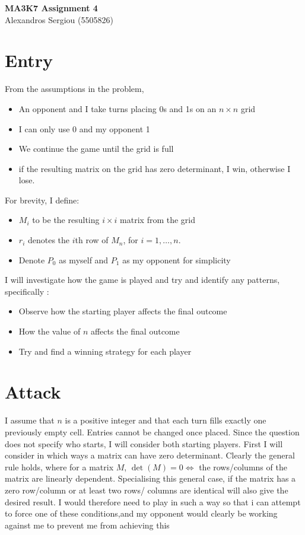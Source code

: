 \documentclass[11pt]{article}
\newcommand{\keywordfont}{\textsc}
\newcommand{\keyword}[1]{%
  \marginpar{\raggedright\small\keywordfont{#1}}}
\begin{document}
\Large
\begin{center}
\textbf{MA3K7 Assignment 4}
\\
Alexandros Sergiou (5505826)
\end{center}
\normalsize

\section{Entry}

\keyword{I KNOW}From the assumptions in the problem,
\begin{itemize}
\item An opponent and I take turns placing 0s and 1s on an $n \times n$ grid
\item I can only use 0 and my opponent 1
\item We continue the game until the grid is full
\item if the resulting matrix on the grid has zero determinant, I win, otherwise I lose.
\end{itemize}
\medskip

\keyword{NOTATION}
For brevity, I define:
\begin{itemize}
\item $M_i$ to be the resulting $i \times i$ matrix from the grid
\item $r_i$ denotes the $i$th row of $M_n$,
for $i=1,\ldots,n$.
\item Denote $P_0$ as myself and $P_1$ as my opponent for simplicity 
\medskip

\end{itemize}

\keyword{I WANT} I will investigate how the game is played and try and identify any patterns, specifically :
\begin{itemize}
\item Observe how the starting player affects the final outcome 
\item How the value of $n$ affects the final outcome
\item Try and find a winning strategy for each player 
\end{itemize}

\section{Attack}I assume that $n$ is a positive integer and that each turn fills exactly one  previously empty cell. Entries cannot be changed once placed. Since the
question does not specify who starts,
I will consider both starting players.
\keyword{I KNOW} First I will consider in which ways a matrix can have zero determinant. Clearly the general rule holds, where for a matrix $M$, $\det(M) = 0 \iff$ the rows/columns of the matrix are linearly dependent. Specialising this general case, if the matrix has a zero row/column or at least two rows/ columns are identical will also give the desired result. I would therefore need to play in such a way so that i can attempt to force one of these conditions,and my opponent would clearly be working against me to prevent me from achieving this 
\end{document}
